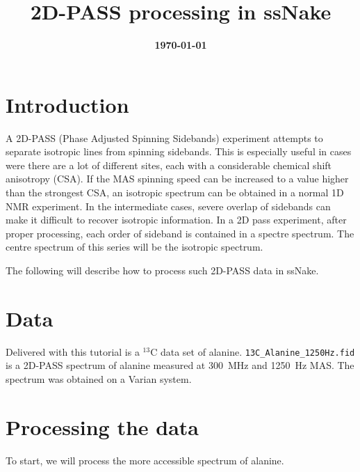 \documentclass[11pt,a4paper]{article}
\title{\color{black}\fontfamily{SourceSansPro-LF}\bfseries 2D-PASS processing in ssNake}
\author{}
\date{\color{black}\fontfamily{SourceSansPro-LF}\bfseries \today}
\begin{document}

\maketitle

\section{Introduction}
A 2D-PASS (Phase Adjusted Spinning Sidebands) experiment attempts to separate isotropic lines from
spinning sidebands. This is especially useful in cases were there are a lot of different sites, each
with a considerable chemical shift anisotropy (CSA). If the MAS spinning speed can be increased to a
value higher than the strongest CSA, an isotropic spectrum can be obtained in a normal 1D NMR
experiment. In the intermediate cases, severe overlap of sidebands can make it difficult to recover
isotropic information. In a 2D pass experiment, after proper processing, each order of sideband is
contained in a spectre spectrum. The centre spectrum of this series will be the isotropic spectrum.

The following will describe how to process such 2D-PASS data in ssNake.



\section{Data}
Delivered with this tutorial is a $^{13}$C data set of alanine.
\texttt{13C\_Alanine\_1250Hz.fid} is a 2D-PASS spectrum of alanine measured at \SI{300}{\MHz} and
\SI{1250}{\Hz} MAS.  The spectrum was obtained on a Varian system.



\section{Processing the data}
To start, we will process the more accessible spectrum of alanine.
\end{document}

